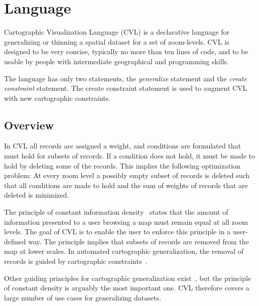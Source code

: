 \section{Language}
\label{sec:cvl-language}
Cartographic Visualization Language (CVL) is a declarative language for generalizing or thinning a spatial dataset for a set of zoom-levels. CVL is designed to be very concise, typically no more than ten lines of code, and to be usable by people with intermediate geographical and programming skills.


The language has only two statements, the \emph{generalize} statement and the \emph{create constraint} statement. The create constraint statement is used to augment CVL with new cartographic constraints.

\subsection{Overview}


In CVL all records are assigned a weight, and conditions are formulated that must hold for subsets of records. If a condition does not hold, it must be made to hold by deleting some of the records. This implies the following optimization problem: At every zoom level a possibly empty subset of records is deleted such that all conditions are made to hold and the sum of weights of records that are deleted is minimized.

The principle of constant information density~\cite{toepfer} states that the amount of information presented to a user browsing a map must remain equal at all zoom levels. The goal of CVL is to enable the user to enforce this principle in a user-defined way. The principle implies that subsets of records are removed from the map at lower scales. In automated cartographic generalization, the removal of records is guided by cartographic constraints~\cite{something}.

Other guiding principles for cartographic generalization exist~\cite{something}, but the principle of constant density is arguably the most important one. CVL therefore covers a large number of use cases for generalizing datasets.

